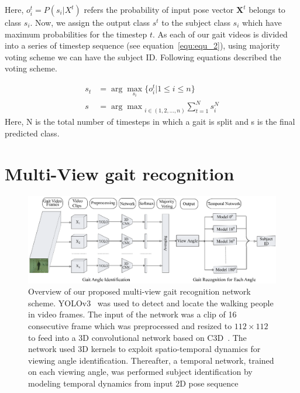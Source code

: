 Here, $o_i^t = P(s_i | X^t)$ refers the probability of input pose vector $\boldsymbol X^t$ belongs to class $s_i$. Now, we assign the output class $s^t$ to the subject class $s_i$ which have maximum probabilities for the timestep $t$. As each of our gait videos is divided into a series of timestep sequence (see equation~\ref{equ:equ_2}), using majority voting scheme we can have the subject ID. Following equations described the voting scheme.

\begin{equation}
\begin{split}
s_t &=  \arg\max_{s_i}{\{o_i^t | 1 \leq i \leq n\}} \\
s &= {\arg\max}_{i\in(1, 2, ...,n)}{\sum_{t=1}^{N}s_i^N}
\end{split}
\end{equation}
Here, N is the total number of timesteps in which a gait is split and s is the final predicted class.  


\section{Multi-View gait recognition}
\begin{figure}[t]
	\centering
	\includegraphics[width=130mm]{figures/multi_view_gait_recognition.eps}
	\caption{
		Overview of our proposed multi-view gait recognition network scheme. YOLOv3~\cite{Redmon_18} was used to detect and locate the walking people in video frames. The input of the network was a clip of 16 consecutive frame which was preprocessed and resized to $112\times112$ to feed into a 3D convolutional network based on C3D~\cite{Tran_15}. The network used 3D kernels to exploit spatio-temporal dynamics for viewing angle identification. Thereafter, a temporal network, trained on each viewing angle, was performed subject identification by modeling temporal dynamics from input 2D pose sequence
	}
	\label{fig:multi_view_gait_recognition}
\end{figure}

